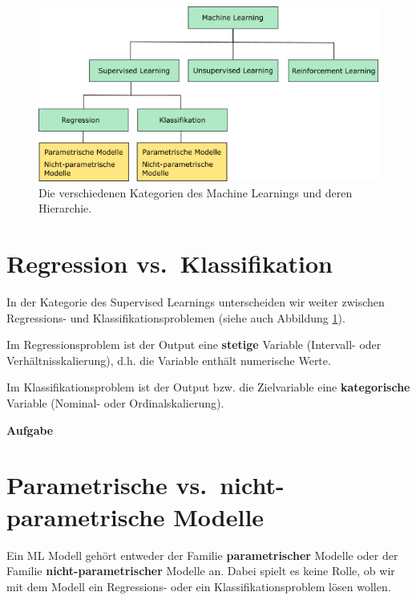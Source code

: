 \documentclass[
]{book}
\begin{document}
\begin{figure}

{\centering \includegraphics[width=0.9\linewidth]{images/SL_UL_RL} 

}

\caption{Die verschiedenen Kategorien des Machine Learnings und deren Hierarchie. }\label{fig:slulrl}
\end{figure}

\hypertarget{regression-vs.-klassifikation}{%
\section{Regression vs.~Klassifikation}\label{regression-vs.-klassifikation}}

In der Kategorie des Supervised Learnings unterscheiden wir weiter zwischen Regressions- und Klassifikationsproblemen (siehe auch Abbildung \ref{fig:slulrl}).

Im Regressionsproblem ist der Output eine \textbf{stetige} Variable (Intervall- oder Verhältnisskalierung), d.h. die Variable enthält numerische Werte.

Im Klassifikationsproblem ist der Output bzw. die Zielvariable eine \textbf{kategorische} Variable (Nominal- oder Ordinalskalierung).

\textbf{Aufgabe}

\hypertarget{parametrische-vs.-nicht-parametrische-modelle}{%
\section{Parametrische vs.~nicht-parametrische Modelle}\label{parametrische-vs.-nicht-parametrische-modelle}}

Ein ML Modell gehört entweder der Familie \textbf{parametrischer} Modelle oder der Familie \textbf{nicht-parametrischer} Modelle an. Dabei spielt es keine Rolle, ob wir mit dem Modell ein Regressions- oder ein Klassifikationsproblem lösen wollen.
\end{document}
